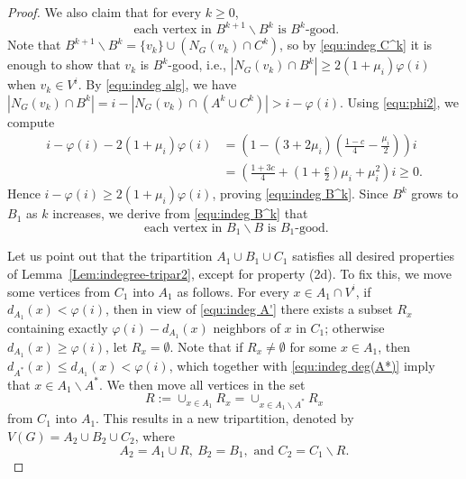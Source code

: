 \documentclass[10pt,a4paper]{amsart}
\begin{document}
\begin{proof}
		We also claim that for every $k\geq 0$,
		\begin{equation}
			\label{equ:indeg B^k}
			\text{ each vertex in } B^{k+1}\backslash B^k \text{ is } B^k\text{-good}.
		\end{equation}
		Note that $B^{k+1}\backslash B^k =\{v_k\}\cup (N_G(v_k)\cap C^k)$, so by \eqref{equ:indeg C^k}
		it is enough to show that $v_k$ is $B^k$-good, i.e., $|N_{G}(v_k)\cap B^k|\geq 2(1+\mu_i)\varphi(i)$ when $v_k\in V^i$.
		By \eqref{equ:indeg alg}, we have $|N_G(v_k)\cap B^k|=i-|N_G(v_k)\cap (A^k\cup C^k)|> i-\varphi(i)$.
		Using \eqref{equ:phi2}, we compute
		\begin{align*}
			i-\varphi(i)-2(1+\mu_i)\varphi(i)
			&=\left(1-(3+2\mu_i)\left(\frac{1-c}{4}-\frac{\mu_i}{2}\right)\right)i\\
			&=\left(\frac{1+3c}{4}+\left(1+\frac{c}{2}\right)\mu_i+\mu_i^2\right)i\ge 0.
		\end{align*}
		Hence $i-\varphi(i)\ge 2(1+\mu_i)\varphi(i)$, proving \eqref{equ:indeg B^k}.
		Since $B^k$ grows to $B_1$ as $k$ increases, we derive from \eqref{equ:indeg B^k} that
		\begin{equation}
			\label{equ:indeg B-good}
			\text{ each vertex in } B_1\backslash B \text{ is } B_1\text{-good}.
		\end{equation}
		
		
		\medskip
		
		Let us point out that the tripartition $A_1 \cup B_1 \cup C_1$ satisfies all desired properties of Lemma~\ref{Lem:indegree-tripar2}, except for property (2d).
		To fix this, we move some vertices from $C_1$ into $A_1$ as follows.
		For every $x\in A_1\cap V^i$,
		if $d_{A_1}(x)<\varphi(i)$, then in view of \eqref{equ:indeg A'} there exists a subset $R_x$
		containing exactly $\varphi(i)-d_{A_1}(x)$ neighbors of $x$ in $C_1$;
		otherwise $d_{A_1}(x)\geq \varphi(i)$, let $R_x=\emptyset$.
		Note that if $R_x\neq \emptyset$ for some $x\in A_1$, then $d_{A^*}(x)\le d_{A_1}(x)<\varphi(i)$,
		which together with \eqref{equ:indeg deg(A*)} imply that $x\in A_1\backslash A^*$.
		We then move all vertices in the set
		\begin{equation}\label{equ:indeg R}
			R:=\cup_{x\in A_1} R_x=\cup_{x\in A_1\backslash A^*} R_x
		\end{equation}
		from $C_1$ into $A_1$.
		This results in a new tripartition, denoted by $V(G)=A_2\cup B_2\cup C_2$, where
		$$A_2=A_1\cup R,~ B_2=B_1, \text{ and } C_2=C_1\backslash R.$$
		

\end{proof}
\end{document}
